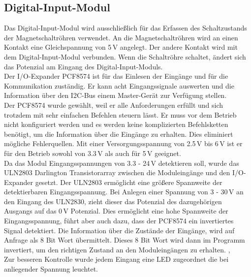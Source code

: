 \subsection{Digital-Input-Modul}
Das Digital-Input-Modul wird ausschließlich für das Erfassen des Schaltzustands der Magnetschaltröhren verwendet. An die Magnetschaltröhren wird an einen Kontakt eine Gleichspannung von 5\,V angelegt. Der andere Kontakt wird mit dem Digital-Input-Modul verbunden. Wenn die Schaltröhre schaltet, ändert sich das Potenzial am Eingang des Digital-Input-Moduls.
\\
Der I/O-Expander PCF8574 ist für das Einlesen der Eingänge und für die Kommunikation zuständig. Er kann acht Eingangssignale auswerten und die Information über den I2C-Bus einem Master-Gerät zur Verfügung stellen.
\cite{pcf8574_datasheet}
\\
Der PCF8574 wurde gewählt, weil er alle Anforderungen erfüllt und sich trotzdem mit sehr einfachen Befehlen steuern lässt. Er muss vor dem Betrieb nicht konfiguriert werden und es werden keine komplizierten Befehlsketten benötigt, um die Information über die Eingänge zu erhalten. Dies eliminiert mögliche Fehlerquellen.
Mit einer Versorgungsspannung von 2.5\,V bis 6\,V ist er für den Betrieb sowohl von 3.3\,V als auch für 5\,V geeignet.
\cite{pcf8574_datasheet}
\\
Da das Modul Eingangsspannungen von 3.3 - 24\,V detektieren soll, wurde das ULN2803 Darlington Transistorarray zwischen die Moduleingänge und den I/O-Expander gesetzt. Der ULN2803 ermöglicht eine größere Spannweite der detektierbaren Eingangsspannung. Bei Anlegen einer Spannung von 3 - 30\,V an den Eingang des ULN2830, zieht dieser das Potenzial des dazugehörigen Ausgangs auf das 0\,V Potenzial. Dies ermöglicht eine hohe Spannweite der Eingangsspannung, führt aber auch dazu, dass der PCF8574 ein invertiertes Signal detektiert. Die Information über die Zustände der Eingänge, wird auf Anfrage als 8 Bit Wort übermittelt. Dieses 8 Bit Wort wird dann im Programm invertiert, um den richtigen Zustand an den Moduleingängen zu erhalten.
\cite{pcf8574_datasheet},
\cite{uln2803_datasheet}
\\
Zur besseren Kontrolle wurde jedem Eingang eine LED  zugeordnet die bei anliegender Spannung leuchtet.

